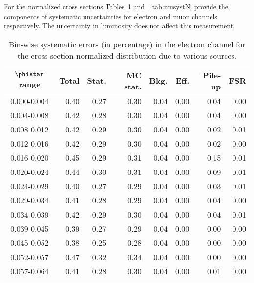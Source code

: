 For the normalized cross sections Tables~\ref{tab:elsystN}  and ~\ref{tab:musystN} provide the components of systematic uncertainties for electron and muon channels respectively.  The uncertainty in luminosity does not affect this measurement. 
\begin{table}[htbp]
\caption{Bin-wise systematic errors (in percentage) in the electron channel for the cross section normalized \phistar distribution due to various sources.}
\label{tab:elsystN}
\begin{center}
\begin{tabular}{ | c | r | r | r | r | r | r | r | } %
\hline
$\phistar$ range & Total & Stat. & MC stat. & Bkg. & Eff. & Pile-up & FSR \\ \hline
0.000-0.004 & 0.40 & 0.27 & 0.30 & 0.04 & 0.00 & 0.04 & 0.00  \\ \hline
0.004-0.008 & 0.42 & 0.28 & 0.30 & 0.04 & 0.00 & 0.04 & 0.00  \\ \hline
0.008-0.012 & 0.42 & 0.29 & 0.30 & 0.04 & 0.00 & 0.02 & 0.01  \\ \hline
0.012-0.016 & 0.42 & 0.29 & 0.30 & 0.04 & 0.00 & 0.02 & 0.00  \\ \hline
0.016-0.020 & 0.45 & 0.29 & 0.31 & 0.04 & 0.00 & 0.15 & 0.01  \\ \hline
0.020-0.024 & 0.44 & 0.30 & 0.31 & 0.04 & 0.00 & 0.09 & 0.01  \\ \hline
0.024-0.029 & 0.40 & 0.27 & 0.29 & 0.04 & 0.00 & 0.03 & 0.01  \\ \hline
0.029-0.034 & 0.41 & 0.28 & 0.29 & 0.04 & 0.00 & 0.04 & 0.00  \\ \hline
0.034-0.039 & 0.42 & 0.29 & 0.30 & 0.04 & 0.00 & 0.04 & 0.01  \\ \hline
0.039-0.045 & 0.39 & 0.27 & 0.29 & 0.04 & 0.00 & 0.00 & 0.00  \\ \hline
0.045-0.052 & 0.38 & 0.25 & 0.28 & 0.04 & 0.00 & 0.00 & 0.00  \\ \hline
0.052-0.057 & 0.47 & 0.32 & 0.34 & 0.04 & 0.00 & 0.00 & 0.00  \\ \hline
0.057-0.064 & 0.41 & 0.28 & 0.30 & 0.04 & 0.00 & 0.01 & 0.00  \\ \hline

\end{tabular}
\end{center}
\end{table}
